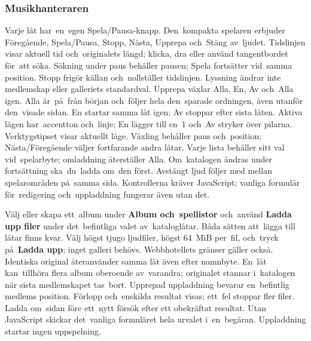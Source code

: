 \documentclass[11pt,a4paper]{article}
\newcommand{\ui}[1]{\textbf{#1}}
\begin{document}
\subsubsection{Musikhanteraren}

Varje låt har~en~egen Spela/Pausa-knapp. Den~kompakta spelaren erbjuder
Föregående, Spela/Pausa, Stopp, Nästa, Upprepa och~Stäng av~ljudet. Tidslinjen
visar aktuell tid och~originalets längd; klicka, dra eller använd tangentbordet
för~att söka. Sökning under paus behåller pausen; Spela fortsätter vid~samma
position. Stopp frigör källan och~nollställer tidslinjen. Lyssning ändrar inte
medlemskap eller galleriets standardval. Upprepa växlar Alla, En, Av och~Alla
igen. Alla är~på~från början och~följer hela den~sparade ordningen, även utanför
den~visade sidan. En startar samma låt igen; Av stoppar efter sista låten.
Aktiva lägen har~accentton och~linje; En lägger till en~1 och~Av stryker över
pilarna. Verktygstipset visar aktuellt läge. Växling behåller paus och~position;
Nästa/Föregående väljer fortfarande andra låtar. Varje lista behåller sitt val
vid~spelarbyte; omladdning återställer Alla. Om~katalogen ändras under
fortsättning ska~du~ladda om~den först. Avstängt ljud följer med mellan
spelarområden på~samma sida. Kontrollerna kräver JavaScript; vanliga formulär
för~redigering och~uppladdning fungerar även utan det.

Välj eller skapa ett~album under \ui{Album och~spellistor} och~använd
\ui{Ladda upp filer} under det~befintliga valet av~kataloglåtar. Båda sätten
att~lägga till låtar finns kvar. Välj högst tjugo ljudfiler, högst 64~MiB
per~fil, och~tryck på~\ui{Ladda upp}; inget galleri behövs. Webbhotellets
gränser gäller också. Identiska original återanvänder samma låt även efter
namnbyte. En~låt kan~tillhöra flera album oberoende av~varandra; originalet
stannar i~katalogen när sista medlemskapet tas~bort. Upprepad uppladdning
bevarar en~befintlig medlems position. Förlopp och~enskilda resultat visas;
ett~fel stoppar fler filer. Ladda om~sidan före ett~nytt försök efter ett
obekräftat resultat. Utan JavaScript skickar det~vanliga formuläret hela
urvalet i~en~begäran. Uppladdning startar ingen uppspelning.
\end{document}
